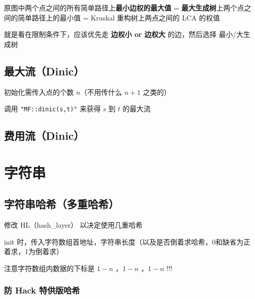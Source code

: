 \documentclass[12pt]{article}
\begin{document}
原图中两个点之间的所有简单路径上\textbf{最小边权的最大值} = \textbf{最大生成树}上两个点之间的简单路径上的最小值 = Kruskal 重构树上两点之间的 LCA 的权值

就是看在限制条件下，应该优先走 \textbf{边权小 or 边权大} 的边，然后选择 最小/大生成树



\newpage

\subsection{最大流（Dinic）}

初始化需传入点的个数 $n$（不用传什么 $n+1$ 之类的）

调用 \texttt{"MF::dinic(s,t)"} 来获得 $s$ 到 $t$ 的最大流



\newpage

\subsection{费用流（Dinic）}



\newpage

{\centering\section{字符串}}

\subsection{字符串哈希（多重哈希）}

修改 HL（hash\_{}layer） 以决定使用几重哈希

init 时，传入字符数组首地址，字符串长度（以及是否倒着求哈希，0和缺省为正着求，1为倒着求）

注意字符数组内数据的下标是 $1-n$ ，$1-n$ ，$1-n$ !!!



\newpage

\subsubsection{防 Hack 特供版哈希}
\end{document}
